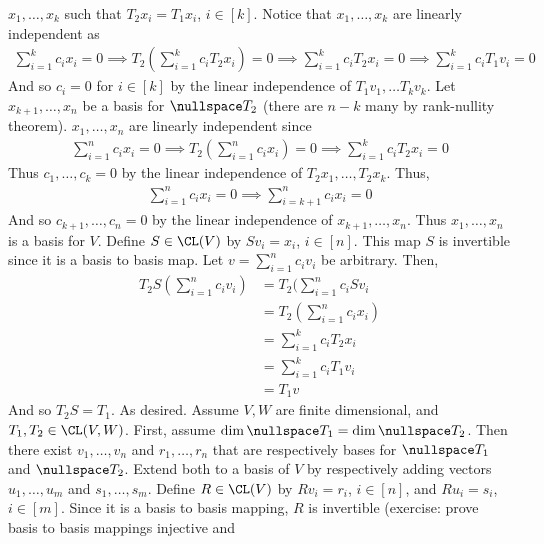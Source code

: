 \documentclass{book}
\begin{document}
\begin{enumerate}[label=\arabic*)]
      $x_1, \dots, x_k$ such that $T_2x_i = T_1x_i$, $i \in [k]$. Notice that $x_1, \dots, x_k$ are linearly independent as
      \begin{align*}
        \sum_{i = 1}^{k}c_ix_i = 0 \implies T_2(\sum_{i = 1}^{k}c_iT_2x_i) = 0 \implies \sum_{i = 1}^{k}c_iT_2x_i = 0 \implies \sum_{i = 1}^{k}c_iT_1v_i = 0
      \end{align*}
      And so $c_i = 0$ for $i \in [k]$ by the linear independence of $T_1v_1, \dots T_kv_k$. Let $x_{k + 1}, \dots, x_n$ be a basis for $\nullspace T_2$ (there are $n - k$ many by
      rank-nullity theorem). $x_1, \dots, x_n$ are linearly independent since
      \begin{align*}
        \sum_{i = 1}^{n}c_ix_i = 0 \implies T_2(\sum_{i = 1}^{n}c_ix_i) = 0 \implies \sum_{i = 1}^{k}c_iT_2x_i = 0
      \end{align*}
      Thus $c_1, \dots, c_k = 0$ by the linear independence of $T_2x_1, \dots, T_2x_k$. Thus,
      \begin{align*}
        \sum_{i = 1}^{n}c_ix_i = 0 \implies \sum_{i = k + 1}^{n}c_ix_i = 0
      \end{align*}
      And so $c_{k + 1}, \dots, c_n = 0$ by the linear independence of $x_{k + 1}, \dots, x_n$. Thus $x_1, \dots, x_n$ is a basis for $V$. Define $S \in \CL(V)$ by $Sv_i = x_i$, $i \in [n]$.
      This map $S$ is invertible since it is a basis to basis map. Let $v = \sum_{i = 1}^{n}c_iv_i$ be arbitrary. Then,
      \begin{align*}
        T_2S(\sum_{i = 1}^{n}c_iv_i) & = T_2(\sum_{i = 1}^{n}c_iSv_i \\
        & = T_2(\sum_{i = 1}^{n}c_ix_i) \\
        & = \sum_{i = 1}^{k}c_iT_2x_i \\
        & = \sum_{i = 1}^{k}c_iT_1v_i \\
        & = T_1v
      \end{align*}
      And so $T_2S = T_1$. As desired.
    \ii
      Assume $V, W$ are finite dimensional, and $T_1, T_2 \in \CL(V, W)$. First, assume $\dim\nullspace T_1 = \dim\nullspace T_2$. Then there exist $v_1, \dots, v_n$ and $r_1, \dots, r_n$
      that are respectively bases for $\nullspace T_1$ and $\nullspace T_2$. Extend both to a basis of $V$ by respectively adding vectors $u_1, \dots, u_m$ and $s_1, \dots, s_m$. Define $R
      \in \CL(V)$ by $Rv_i = r_i$, $i \in [n]$, and $Ru_i = s_i$, $i \in [m]$. Since it is a basis to basis mapping, $R$ is invertible (exercise: prove basis to basis mappings injective and

\end{enumerate}
\end{document}
